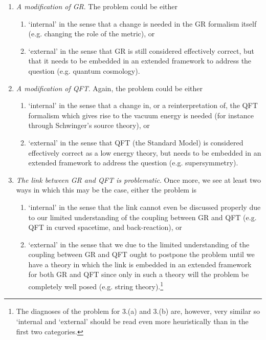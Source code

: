 \documentclass[12pt]{article}
\begin{document}
\begin{enumerate}

\item {\em A modification of GR}. The problem could be either 

\begin{enumerate}

\item `internal' in the sense that a change is needed
in the GR formalism itself (e.g. changing the role of the 
metric), or

\item `external' in the sense that GR is still considered 
effectively correct, but that it needs to be  embedded in an
extended framework to address the question (e.g. quantum cosmology).

\end{enumerate}

\item {\em A modification of QFT}. Again, the problem could be either

\begin{enumerate}

\item `internal' in the sense that
a change in, or a reinterpretation of, the QFT formalism
which gives rise to the vacuum energy is needed
(for instance through Schwinger's source theory), or

\item `external' in the sense that QFT (the Standard Model) 
is considered effectively correct as a low energy theory, but needs 
to be embedded in an extended framework to address the question 
(e.g. supersymmetry).

\end{enumerate}

\item {\em The link between GR and QFT is problematic}. Once more,
we see at least two ways in which this may be the case, either
the problem is 

\begin{enumerate}

\item `internal' in the sense that the link cannot even be
discussed properly due to our limited understanding of the coupling between 
GR and QFT (e.g. QFT in curved spacetime,
and back-reaction), or

\item `external' in the sense that we due to the limited
understanding of the coupling between GR and QFT ought to postpone
the problem until we have a theory in which the link is embedded
in an extended framework for both GR and QFT since only in such a
theory will the problem be completely well posed (e.g.
string theory).\footnote{The diagnoses of the problem for 3.(a) and
3.(b) are, however, very similar so `internal and `external'
should be read even more heuristically than in the first two
categories.}

\end{enumerate}
\end{enumerate}
\end{document}
